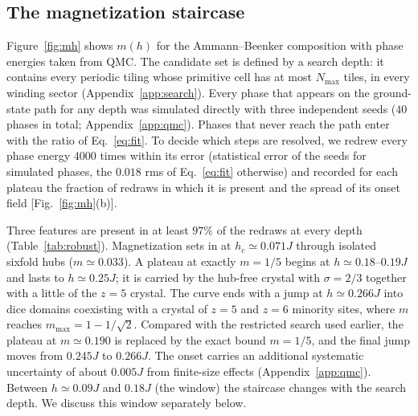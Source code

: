 \documentclass[aps,prb,twocolumn,superscriptaddress,floatfix]{revtex4-2}
\begin{document}
\subsection{The magnetization staircase}

Figure~\ref{fig:mh} shows $m(h)$ for the Ammann--Beenker composition with phase energies taken from QMC. The candidate set is defined by a search depth: it contains every periodic tiling whose primitive cell has at most $N_{\max}$ tiles, in every winding sector (Appendix~\ref{app:search}). Every phase that appears on the ground-state path for any depth was simulated directly with three independent seeds ($40$ phases in total; Appendix~\ref{app:qmc}). Phases that never reach the path enter with the ratio of Eq.~\eqref{eq:fit}. To decide which steps are resolved, we redrew every phase energy $4000$ times within its error (statistical error of the seeds for simulated phases, the $0.018$ rms of Eq.~\eqref{eq:fit} otherwise) and recorded for each plateau the fraction of redraws in which it is present and the spread of its onset field [Fig.~\ref{fig:mh}(b)].

Three features are present in at least $97\%$ of the redraws at every depth (Table~\ref{tab:robust}). Magnetization sets in at $h_c\simeq0.071J$ through isolated sixfold hubs ($m\simeq0.033$). A plateau at exactly $m=1/5$ begins at $h\simeq0.18$--$0.19J$ and lasts to $h\simeq0.25J$; it is carried by the hub-free crystal with $\sigma=2/3$ together with a little of the $z=5$ crystal. The curve ends with a jump at $h\simeq0.266J$ into dice domains coexisting with a crystal of $z=5$ and $z=6$ minority sites, where $m$ reaches $m_{\max}=1-1/\sqrt2$. Compared with the restricted search used earlier, the plateau at $m\simeq0.190$ is replaced by the exact bound $m=1/5$, and the final jump moves from $0.245J$ to $0.266J$. The onset carries an additional systematic uncertainty of about $0.005J$ from finite-size effects (Appendix~\ref{app:qmc}). Between $h\simeq0.09J$ and $0.18J$ (the window) the staircase changes with the search depth. We discuss this window separately below.
\end{document}

